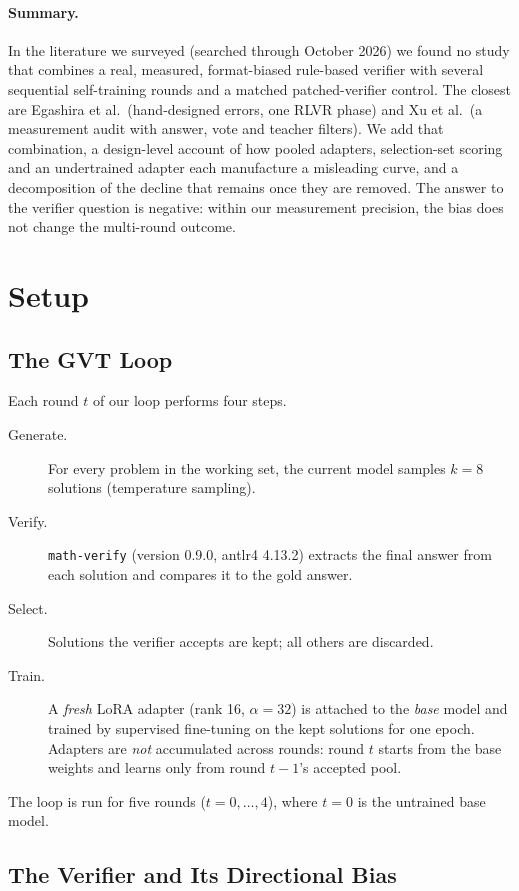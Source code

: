 \documentclass[runningheads]{llncs}
\begin{document}
\paragraph{Summary.}
In the literature we surveyed (searched through October 2026) we found no
study that combines a real, measured, format-biased rule-based verifier with
several sequential self-training rounds and a matched patched-verifier
control. The closest are Egashira et al.\ (hand-designed errors, one RLVR
phase) and Xu et al.\ (a measurement audit with answer, vote and teacher
filters). We add that combination, a design-level account of how pooled
adapters, selection-set scoring and an undertrained adapter each manufacture a
misleading curve, and a decomposition of the decline that remains once they are
removed. The answer to the verifier question is negative: within our
measurement precision, the bias does not change the multi-round outcome.

\section{Setup}
\label{sec:setup}

\subsection{The GVT Loop}
\label{sec:loop}

Each round $t$ of our loop performs four steps.
\begin{description}
\item[Generate.] For every problem in the working set, the current model
samples $k = 8$ solutions (temperature sampling).
\item[Verify.] \texttt{math-verify} (version 0.9.0, antlr4 4.13.2) extracts
the final answer from each solution and compares it to the gold answer.
\item[Select.] Solutions the verifier accepts are kept; all others are
discarded.
\item[Train.] A \emph{fresh} LoRA adapter (rank 16, $\alpha = 32$) is
attached to the \emph{base} model and trained by supervised fine-tuning on
the kept solutions for one epoch. Adapters are \emph{not} accumulated
across rounds: round $t$ starts from the base weights and learns only from
round $t-1$'s accepted pool.
\end{description}
The loop is run for five rounds ($t = 0,\dots,4$), where $t = 0$ is the
untrained base model.

\subsection{The Verifier and Its Directional Bias}
\label{sec:verifier}
\end{document}
